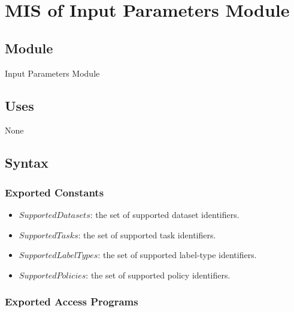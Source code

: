 \documentclass[12pt, titlepage]{article}
\begin{document}
\newpage




\section{MIS of Input Parameters Module} \label{Module_InputParameters}

\subsection{Module}

Input Parameters Module

\subsection{Uses}

None

\subsection{Syntax}

\subsubsection{Exported Constants}

\begin{itemize}
    \item $SupportedDatasets$: the set of supported dataset identifiers.
    \item $SupportedTasks$: the set of supported task identifiers.
    \item $SupportedLabelTypes$: the set of supported label-type identifiers.
    \item $SupportedPolicies$: the set of supported policy identifiers.
\end{itemize}

\subsubsection{Exported Access Programs}
\end{document}
